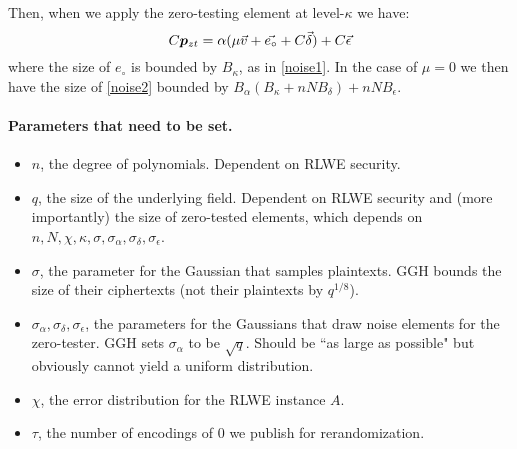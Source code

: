 Then, when we apply the zero-testing element at level-$\kappa$ we have:
\begin{equation}
\label{noise2}
C\bm{p}_{zt} = \alpha (\mu \vec{v} + \vec{e_{\circ}} + C\vec{\delta}) + C\vec{\epsilon}
\end{equation}
where the size of $e_{\circ}$ is bounded by $B_\kappa$, as in \eqref{noise1}.  In the case of $\mu = 0$ we then have the size of \eqref{noise2} bounded by $B_\alpha(B_\kappa + nNB_\delta) + nNB_\epsilon$.

\paragraph{Parameters that need to be set.}

\begin{itemize}
\item $n$, the degree of polynomials.  Dependent on RLWE security.
\item $q$, the size of the underlying field.  Dependent on RLWE security and (more importantly) the size of zero-tested elements, which depends on $n, N, \chi, \kappa, \sigma, \sigma_\alpha, \sigma_\delta, \sigma_\epsilon$.
\item $\sigma$, the parameter for the Gaussian that samples plaintexts.  GGH bounds the size of their ciphertexts (not their plaintexts by $q^{1/8}$).
\item $\sigma_\alpha, \sigma_\delta, \sigma_\epsilon$, the parameters for the Gaussians that draw noise elements for the zero-tester.  GGH sets $\sigma_\alpha$ to be $\sqrt{q}$.  Should be ``as large as possible" but obviously cannot yield a uniform distribution.
\item $\chi$, the error distribution for the RLWE instance $A$.
\item $\tau$, the number of encodings of $0$ we publish for rerandomization.
\end{itemize}


